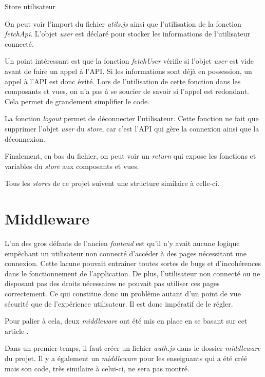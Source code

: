 \begin{listing}[H]
    \inputminted{js}{assets/code/userStore.js}
    \caption{Store utilisateur}
\end{listing}

On peut voir l'import du fichier \emph{utils.js} ainsi que l'utilisation de la fonction \emph{fetchApi}.
L'objet \emph{user} est déclaré pour stocker les informations de l'utilisateur connecté.

Un point intéressant est que la fonction \emph{fetchUser} vérifie si l'objet \emph{user} est vide avant de faire un appel à l'API. Si les informations sont déjà en possession, un appel à l'API est donc évité. Lors de l'utilisation de cette fonction dans les composants et vues, on n'a pas à se soucier de savoir si l'appel est redondant. Cela permet de grandement simplifier le code.

La fonction \emph{logout} permet de déconnecter l'utilisateur. Cette fonction ne fait que supprimer l'objet \emph{user} du \emph{store}, car c'est l'API qui gère la connexion ainsi que la déconnexion.

Finalement, en bas du fichier, on peut voir un \emph{return} qui expose les fonctions et variables du \emph{store} aux composants et vues.

Tous les \emph{stores} de ce projet suivent une structure similaire à celle-ci.

\section{Middleware}
L'un des gros défauts de l'ancien \emph{fontend} est qu'il n'y avait aucune logique empêchant un utilisateur non connecté d'accéder à des pages nécessitant une connexion. Cette lacune pouvait entraîner toutes sortes de bugs et d'incohérences dans le fonctionnement de l'application. De plus, l'utilisateur non connecté ou ne disposant pas des droits nécessaires ne pouvait pas utiliser ces pages correctement. Ce qui constitue donc un problème autant d'un point de vue sécurité que de l'expérience utilisateur. Il est donc impératif de le régler.

Pour palier à cela, deux \emph{middleware} ont été mis en place en se basant sur cet article \cite{middlewareVuejs}.

Dans un premier temps, il faut créer un fichier \emph{auth.js} dans le dossier \emph{middleware} du projet. Il y a également un \emph{middleware} pour les enseignants qui a été créé mais son code, très similaire à celui-ci, ne sera pas montré.

